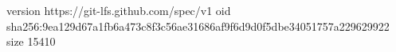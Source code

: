 version https://git-lfs.github.com/spec/v1
oid sha256:9ea129d67a1fb6a473c8f3c56ae31686af9f6d9d0f5dbe34051757a229629922
size 15410
